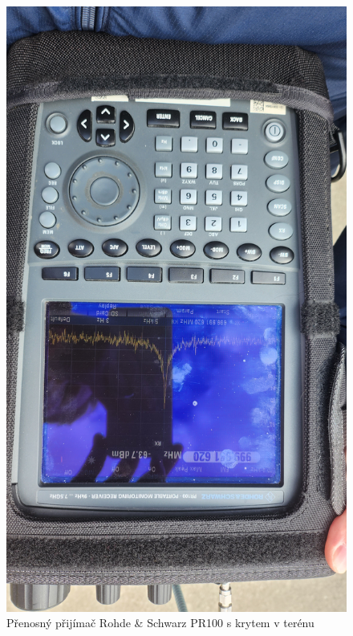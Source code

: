 \begin{figure}[h!]
    \centering
    \includegraphics[angle=90,scale=0.06]{img/prijimac1.jpg}
    \caption{Přenosný přijímač Rohde \& Schwarz PR100 s krytem v terénu}
    \label{fig:my_label}
\end{figure}


